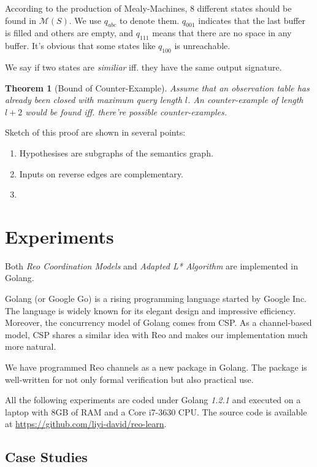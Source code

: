 \documentclass[conference, a4paper]{IEEEtran}
\newtheorem{theorem}{Theorem}
\begin{document}
According to the production of Mealy-Machines, 8 different states should be found in
$\mathcal{M}(S)$. We use $q_{abc}$ to denote them. $q_{001}$ indicates that the last buffer is
filled and others are empty, and $q_{111}$ means that there are no space in any buffer. It's
obvious that some states like $q_{100}$ is unreachable.

We say if two states are \emph{similiar} iff. they have the same output signature.

\begin{theorem}[Bound of Counter-Example]
  \label{the:cebound} Assume that an observation table has already been closed with maximum
  query length  $l$. An counter-example of length $l+2$ would be
  found iff. there're possible counter-examples.
\end{theorem}
\begin{IEEEproof}
  Sketch of this proof are shown in several points:
  \begin{enumerate}
    \item Hypothesises are subgraphs of the semantics graph.
    \item Inputs on reverse edges are complementary.
    \item 
  \end{enumerate}
\end{IEEEproof}

\section{Experiments} 
Both \emph{Reo Coordination Models} and \emph{Adapted L* Algorithm} are implemented in
Golang\cite{golang}.

Golang (or Google Go) is a rising programming language started by Google Inc. The language is widely
known for its elegant design and impressive efficiency. Moreover, the concurrency model of Golang
comes from CSP\cite{DBLP:books/ph/Hoare85}. As a channel-based model, CSP shares a similar idea with
Reo and makes our implementation much more natural.

We have programmed Reo channels as a new package in Golang. The package is well-written for not only
formal verification but also practical use.

All the following experiments are coded under Golang \emph{1.2.1} and executed on a laptop with 8GB
of RAM and a Core i7-3630 CPU. The source code is available at
\url{https://github.com/liyi-david/reo-learn}.

\subsection{Case Studies}
 
\end{document}
